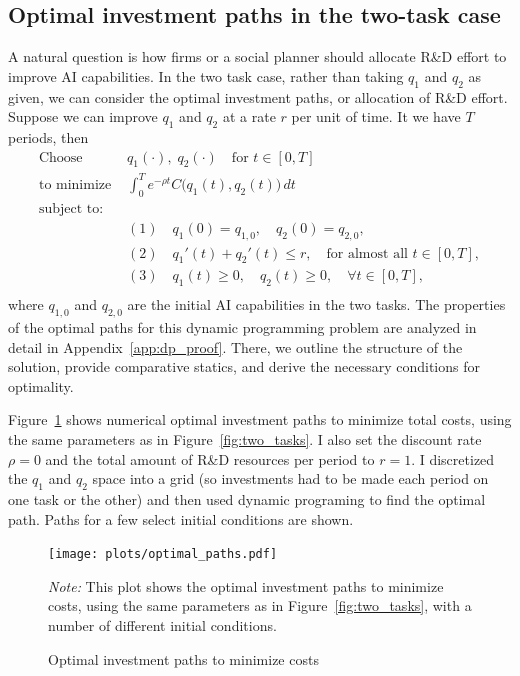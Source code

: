 \documentclass{article}
\theoremstyle{plain}
\theoremstyle{plain}
\begin{document}
\subsection{Optimal investment paths in the two-task case}
A natural question is how firms or a social planner should allocate R\&D effort to improve AI capabilities.
In the two task case, rather than taking $q_1$ and $q_2$ as given, we can consider the optimal investment paths, or allocation of R\&D effort.
Suppose we can improve $q_1$ and $q_2$ at a rate $r$ per unit of time.
It we have $T$ periods, then 
\[
\begin{aligned}
\text{Choose } &q_1(\cdot), \; q_2(\cdot) \quad \text{for } t \in [0, T]\\
\text{to minimize } &
   \int_{0}^{T}
   e^{-\rho t} C\bigl(q_1(t), q_2(t)\bigr) \, dt \\[1em]
\text{subject to:} & \\[-1em]
&(1)\quad q_1(0) = q_{1,0}, \quad q_2(0) = q_{2,0}, \\[6pt]
&(2)\quad q_1'(t) + q_2'(t) \le r, \quad \text{for almost all } t \in [0, T], \\[6pt]
&(3)\quad q_1(t) \geq 0, \quad q_2(t) \geq 0, \quad \forall t \in [0, T], \\[6pt]
\end{aligned}
\label{eq:dp_problem}
\]
where $q_{1,0}$ and $q_{2,0}$ are the initial AI capabilities in the two tasks.
The properties of the optimal paths for this dynamic programming problem are analyzed in detail in Appendix~\ref{app:dp_proof}. 
There, we outline the structure of the solution, provide comparative statics, and derive the necessary conditions for optimality.

Figure~\ref{fig:optimal_paths} shows numerical optimal investment paths to minimize total costs, using the same parameters as in Figure~\ref{fig:two_tasks}.
I also set the discount rate $\rho = 0$ and the total amount of R\&D resources per period  to $r = 1$.
I discretized the $q_1$ and $q_2$ space into a grid (so investments had to be made each period on one task or the other) and then used dynamic programing to find the optimal path.
Paths for a few select initial conditions are shown.

\begin{figure}
  \begin{center}
  \caption{Optimal investment paths to minimize costs} \label{fig:optimal_paths}
  \label{fig:optimal_paths} 
  \texttt{[image: plots/optimal\_paths.pdf]}
  \end{center}
  \begin{footnotesize}
  \emph{Note:} This plot shows the optimal investment paths to minimize costs, using the same parameters as in Figure~\ref{fig:two_tasks}, with a number of different initial conditions.
\end{footnotesize}
\end{figure}
\end{document}
